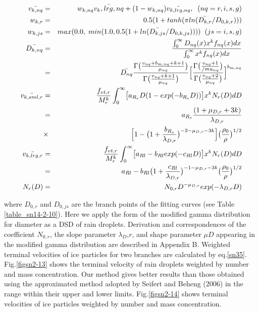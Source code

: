 \begin{eqnarray}
\bar{v_{k,nq}}&=&w_{k,nq}\bar{v_k,lrg,nq}+(1-w_{k,nq})\bar{v_{k,lrg,nq}},\;\;(nq=r,i,s,g)\label{sn36}\\
w_{k,r}&=&0.5(1+tanh(\pi ln(\bar{D_{k,r}}/D_{0,k,r})))\nonumber\\
w_{k,js}&=&max(0.0, \;min(1.0,0.5(1+ln(\bar{D_{k,js}}/D_{0,k,js}))))\;\;(js=i,s,g)\nonumber\\
\bar{D_{k,nq}}&=&\frac{\int_{0}^{\infty}D_{nq}(x)x^{k}f_{nq}(x)dx}{\int_{0}^{\infty}x^{k}f_{nq}(x)dx}\nonumber\\
              &=&\bar{D_{nq}}\frac{\Gamma\bigl(\frac{v_{nq}+b_{m,nq}+k+1}{\mu_{nq}}\bigr)}{\Gamma\bigl(\frac{v_{nq}+k+1}{\mu_{nq}}\bigr)}\Bigl[\frac{\Gamma\bigl(\frac{v_{nq}+1}{/mu_{nq}}\bigr)}{\Gamma\bigl(\frac{v_{nq}+2}{\mu_{nq}}\bigr)}\Bigr]^{b_{m,nq}}\label{sn37}\\
\bar{v_{k,sml,r}}&=&\frac{f_{vt,r}}{M_{r}^{k}}\int_{0}^{\infty}\bigl[a_{R_{s}}D(1-exp(-b_{R_{s}}D))\bigr]x^{k}N_{r}(D)dD\nonumber\\
&=&a_{R_{s}}\frac{(1+\mu_{D,r}+3k)}{\lambda_{D,r}}\nonumber\\
&\times&\Bigl[1-\bigl(1+\frac{b_{R_{s}}}{\lambda_{D,r}}\bigr)^{-2-\mu_{D,r}-3k}\Bigr]\bigl(\frac{\rho_{0}}{\rho}\bigr)^{1/2}\label{sn38}\\
\bar{v_{k,lrg,r}}&=&\frac{f_{vt,r}}{M_{r}^{k}}\int_{0}^{\infty}\bigl[a_{Rl}-b_{Rl}exp(-c_{Rl}D)\bigr]x^{k}N_{r}(D)dD\nonumber\\
&=&a_{Rl}-b_{Rl}\bigl(1+\frac{c_{Rl}}{\lambda_{D,r}}\bigr)^{-1-\mu_{D,r}-3k}\bigl(\frac{\rho_{0}}{\rho}\bigr)^{1/2}\label{sn39}\\
N_{r}(D)&=&N_{0,r}D^{-\mu_{D,r}}exp(-\lambda_{D,r}D)
\end{eqnarray}

where $D_{0,r}$ and $D_{0,js}$ are the branch points of the fitting curves (see Table \ref{table_sn14-2-10}). Here we apply the form of the modified gamma distribution for diameter as a DSD of rain droplets. Derivation and correspondences of the coefficient $N_{0,r}$, the slope parameter $\lambda_{D}$,$r$, and shape parameter $\mu D$ appearing in the modified gamma distribution are described in Appendix B. Weighted terminal velocities of ice particles for two branches are calculated by eq.\ref{sn35}. Fig.\ref{figsn2-13} shows the terminal velocity of rain droplets weighted by number and mass concentration. Our method gives better results than those obtained using the approximated method adopted by Seifert and Beheng (2006) in the range within their upper and lower limits. Fig.\ref{figsn2-14} shows terminal velocities of ice particles weighted by number and mass concentration.


